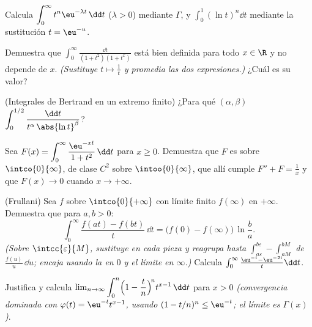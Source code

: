 \begin{exercise}[$\star$]\label{exo:b2:integration:2}
Calcula $\displaystyle\int_0^\infty t^n \eu^{-\lambda t}\,\dd t$
($\lambda > 0$) mediante $\Gamma$, y $\displaystyle\int_0^1 (\ln
t)^n \dd t$ mediante la sustitución $t = \eu^{-u}$.
\end{exercise}

\begin{exercise}[$\star$]\label{exo:b2:integration:3}
Demuestra que $\displaystyle\int_0^{\infty} \frac{\dd t}{(1 +
t^2)(1 + t^x)}$ está bien definida para todo $x \in \R$ y no depende
de $x$. \emph{(Sustituye $t \mapsto \frac1t$ y promedia las dos
expresiones.)} ¿Cuál es su valor?
\end{exercise}

\begin{exercise}[$\star\star$]\label{exo:b2:integration:4}
(Integrales de Bertrand en un extremo finito) ¿Para qué $(\alpha,
\beta)$  $\displaystyle\int_0^{1/2}
\frac{\dd t}{t^\alpha\,\abs{\ln t}^\beta}$?
\end{exercise}

\begin{exercise}[$\star\star$]\label{exo:b2:integration:5}
Sea $F(x) = \displaystyle\int_0^{\infty} \frac{\eu^{-xt}}{1 +
t^2}\,\dd t$ para $x \geq 0$. Demuestra que $F$ es  sobre
$\intco{0}{\infty}$, de clase $C^2$ sobre $\intoo{0}{\infty}$, que
allí cumple $F'' + F = \frac1x$ y que $F(x) \to 0$ cuando $x \to
+\infty$.
\end{exercise}

\begin{exercise}[$\star\star$]\label{exo:b2:integration:6}
(Frullani) Sea $f$  sobre $\intco{0}{+\infty}$ con límite
finito $f(\infty)$ en $+\infty$. Demuestra que para $a, b > 0$:
\[
\int_0^{\infty} \frac{f(at) - f(bt)}{t}\,\dd t
= \bigl(f(0) - f(\infty)\bigr)\,\ln\frac ba .
\]
\emph{(Sobre $\intcc{\varepsilon}{M}$, sustituye en cada pieza y
reagrupa hasta $\int_{a\varepsilon}^{b\varepsilon} - \int_{aM}^{bM}$
de $\frac{f(u)}u\,\dd u$; encaja usando la  en $0$ y el
límite en $\infty$.)} Calcula $\int_0^\infty \frac{\eu^{-t} -
\eu^{-2t}}{t}\dd t$.
\end{exercise}

\begin{exercise}[$\star\star$]\label{exo:b2:integration:7}
Justifica y calcula $\lim_{n\to\infty} \displaystyle\int_0^n \Bigl(1
- \frac tn\Bigr)^{\!n} t^{x-1}\,\dd t$ para $x > 0$
\emph{(convergencia dominada con $\varphi(t) = \eu^{-t}t^{x-1}$,
usando $(1 - t/n)^n \leq \eu^{-t}$; el límite es $\Gamma(x)$)}.
\end{exercise}

